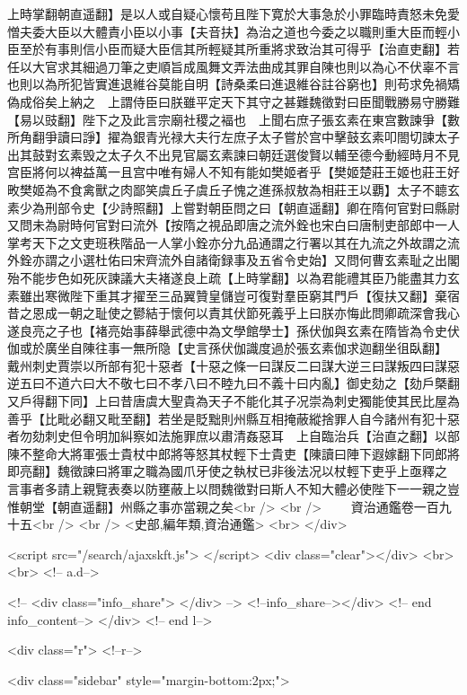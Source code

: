 上時掌翻朝直遥翻】是以人或自疑心懷苟且陛下寛於大事急於小罪臨時責怒未免愛憎夫委大臣以大體責小臣以小事【夫音扶】為治之道也今委之以職則重大臣而輕小臣至於有事則信小臣而疑大臣信其所輕疑其所重將求致治其可得乎【治直吏翻】若任以大官求其細過刀筆之吏順旨成風舞文弄法曲成其罪自陳也則以為心不伏辜不言也則以為所犯皆實進退維谷莫能自明【詩桑柔曰進退維谷註谷窮也】則苟求免禍矯偽成俗矣上納之　上謂侍臣曰朕雖平定天下其守之甚難魏徵對曰臣聞戰勝易守勝難【易以豉翻】陛下之及此言宗廟社稷之褔也　上聞右庶子張玄素在東宫數諫爭【數所角翻爭讀曰諍】擢為銀青光禄大夫行左庶子太子嘗於宫中擊鼓玄素叩閤切諫太子出其鼓對玄素毁之太子久不出見官屬玄素諫曰朝廷選俊賢以輔至德今動經時月不見宫臣將何以裨益萬一且宫中唯有婦人不知有能如樊姬者乎【樊姬楚莊王姬也莊王好畋樊姬為不食禽獸之肉鄙笑虞丘子虞丘子愧之進孫叔敖為相莊王以覇】太子不聼玄素少為刑部令史【少詩照翻】上嘗對朝臣問之曰【朝直遥翻】卿在隋何官對曰縣尉又問未為尉時何官對曰流外【按隋之視品即唐之流外銓也宋白曰唐制吏部郎中一人掌考天下之文吏班秩階品一人掌小銓亦分九品通謂之行署以其在九流之外故謂之流外銓亦謂之小選杜佑曰宋齊流外自諸衛録事及五省令史始】又問何曹玄素耻之出閣殆不能步色如死灰諫議大夫褚遂良上疏【上時掌翻】以為君能禮其臣乃能盡其力玄素雖出寒微陛下重其才擢至三品翼贊皇儲豈可復對羣臣窮其門戶【復扶又翻】棄宿昔之恩成一朝之耻使之鬰結于懷何以責其伏節死義乎上曰朕亦悔此問卿疏深會我心遂良亮之子也【褚亮始事薛舉武德中為文學館學士】孫伏伽與玄素在隋皆為令史伏伽或於廣坐自陳往事一無所隐【史言孫伏伽識度過於張玄素伽求迦翻坐徂臥翻】　戴州刺史賈崇以所部有犯十惡者【十惡之條一曰謀反二曰謀大逆三曰謀叛四曰謀惡逆五曰不道六曰大不敬七曰不孝八曰不睦九曰不義十曰内亂】御史劾之【劾戶槩翻又戶得翻下同】上曰昔唐虞大聖貴為天子不能化其子况崇為刺史獨能使其民比屋為善乎【比毗必翻又毗至翻】若坐是貶黜則州縣互相掩蔽縱捨罪人自今諸州有犯十惡者勿劾刺史但令明加糾察如法施罪庶以肅清姦惡耳　上自臨治兵【治直之翻】以部陳不整命大將軍張士貴杖中郎將等怒其杖輕下士貴吏【陳讀曰陣下遐嫁翻下同郎將即亮翻】魏徵諫曰將軍之職為國爪牙使之執杖已非後法况以杖輕下吏乎上亟釋之　言事者多請上親覽表奏以防壅蔽上以問魏徵對曰斯人不知大體必使陛下一一親之豈惟朝堂【朝直遥翻】州縣之事亦當親之矣<br />
<br />
　　資治通鑑卷一百九十五<br />
<br />
<史部,編年類,資治通鑑>  <br>
   </div> 

<script src="/search/ajaxskft.js"> </script>
 <div class="clear"></div>
<br>
<br>
 <!-- a.d-->

 <!--
<div class="info_share">
</div> 
-->
 <!--info_share--></div>   <!-- end info_content-->
  </div> <!-- end l-->

<div class="r">   <!--r-->



<div class="sidebar"  style="margin-bottom:2px;">

